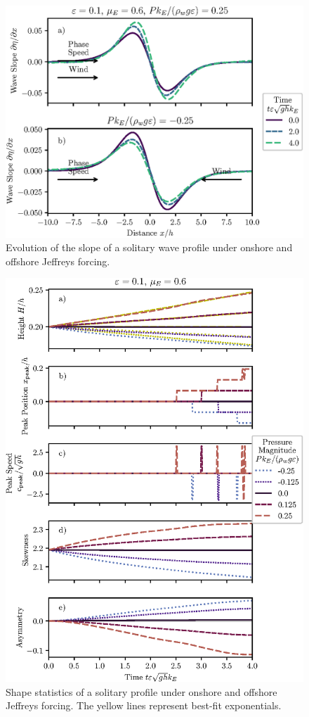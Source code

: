 \documentclass{jfm}
\begin{document}
\begin{figure}
  \centering
  \includegraphics{Slopes-Positive-Negative.eps}
  \caption{
    Evolution of the slope of a solitary wave profile under onshore and
    offshore Jeffreys forcing.
  }
\end{figure}

\begin{figure}
  \centering
  \includegraphics{Skew-Asymm.eps}
  \caption{
    Shape statistics of a solitary profile under onshore and offshore
    Jeffreys forcing. The yellow lines represent best-fit exponentials.
  }
\end{figure}
\end{document}
